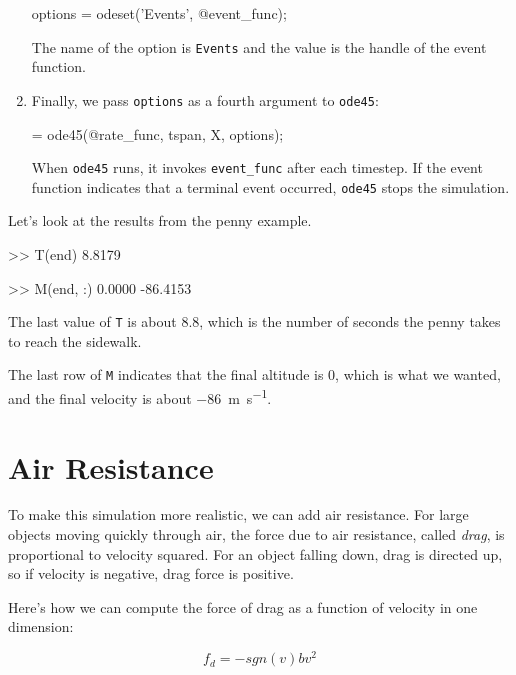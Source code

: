 \begin{enumerate}
\begin{code}
options = odeset('Events', @event_func);
\end{code}
%
The name of the option is {\tt Events} and the value is the handle of the event function.  

\item Finally, we pass {\tt options} as a fourth argument to {\tt ode45}:

\begin{code}
[T, M] = ode45(@rate_func, tspan, X, options);
\end{code}

When {\tt ode45} runs, it invokes \verb"event_func" after each timestep.  If the event function indicates that a terminal event occurred, 
{\tt ode45} stops the simulation.

\end{enumerate}

Let's look at the results from the penny example.  

\begin{code}
>> T(end)
8.8179

>> M(end, :)
0.0000  -86.4153
\end{code}

The last value of {\tt T} is about 8.8, which is the number of seconds the penny takes to reach the sidewalk.

The last row of {\tt M} indicates that the final altitude is 0, which is what we wanted, and the final velocity is about \SI{-86}{\meter \per \second}.


\section{Air Resistance}
\label{air_resistance}


To make this simulation more realistic, we can add air resistance.
For large objects moving quickly through air, the force due to air resistance, called \emph{drag}, is proportional to velocity squared.  
For an object falling down, drag is
directed up, so if velocity is negative, drag force is positive.


Here's how we can compute the force of drag as a function of velocity in one dimension:

\begin{equation}
    f_d = -sgn(v) b v^2 
\end{equation}

